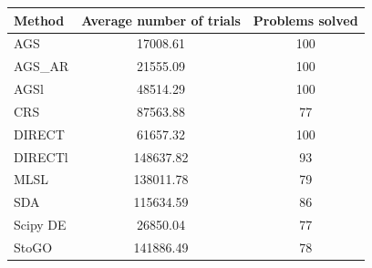 \documentclass[a4paper]{article}
\begin{document}
\begin{tabular}{lcc}
\hline
 Method   &  Average number of trials  &  Problems solved  \\
\hline
 AGS      &          17008.61          &        100        \\
 AGS\_AR   &          21555.09          &        100        \\
 AGSl     &          48514.29          &        100        \\
 CRS      &          87563.88          &        77         \\
 DIRECT   &          61657.32          &        100        \\
 DIRECTl  &         148637.82          &        93         \\
 MLSL     &         138011.78          &        79         \\
 SDA      &         115634.59          &        86         \\
 Scipy DE &          26850.04          &        77         \\
 StoGO    &         141886.49          &        78         \\
\hline
\end{tabular}
\end{document}

